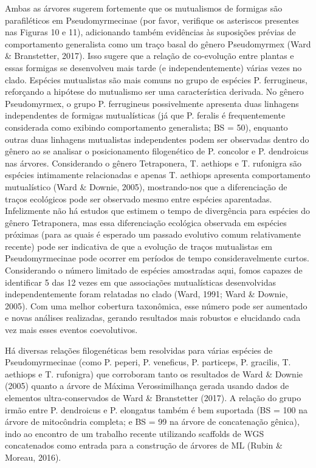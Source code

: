 \documentclass[../DISSERTACAO_MAIN.tex]{subfiles}
\begin{document}
	Ambas as árvores sugerem fortemente que os mutualismos de formigas são parafiléticos em Pseudomyrmecinae (por favor, verifique os asteriscos presentes nas Figuras 10 e 11), adicionando também evidências às suposições prévias de comportamento generalista como um traço basal do gênero Pseudomyrmex (Ward \& Branstetter, 2017). Isso sugere que a relação de co-evolução entre plantas e essas formigas se desenvolveu mais tarde (e independentemente) várias vezes no clado. Espécies mutualistas são mais comuns no grupo de espécies P. ferrugineus, reforçando a hipótese do mutualismo ser uma característica derivada. No gênero Pseudomyrmex, o grupo P. ferrugineus possivelmente apresenta duas linhagens independentes de formigas mutualísticas (já que P. feralis é frequentemente considerada como exibindo comportamento generalista; BS = 50), enquanto outras duas linhagens mutualistas independentes podem ser observadas dentro do gênero ao se analisar o posicionamento filogenético de P. concolor e P. dendroicus nas árvores. Considerando o gênero Tetraponera, T. aethiops e T. rufonigra são espécies intimamente relacionadas e apenas T. aethiops apresenta comportamento mutualístico (Ward \& Downie, 2005), mostrando-nos que a diferenciação de traços ecológicos pode ser observado mesmo entre espécies aparentadas. Infelizmente não há estudos que estimem o tempo de divergência para espécies do gênero Tetraponera, mas essa diferenciação ecológica observada em espécies próximas (para as quais é esperado um passado evolutivo comum relativamente recente) pode ser indicativa de que a evolução de traços mutualistas em Pseudomyrmecinae pode ocorrer em períodos de tempo consideravelmente curtos. Considerando o número limitado de espécies amostradas aqui, fomos capazes de identificar 5 das 12 vezes em que associações mutualísticas desenvolvidas independentemente foram relatadas no clado (Ward, 1991; Ward \& Downie, 2005). Com uma melhor cobertura taxonômica, esse número pode ser aumentado e novas análises realizadas, gerando resultados mais robustos e elucidando cada vez mais esses eventos coevolutivos.
	
	Há diversas relações filogenéticas bem resolvidas para várias espécies de Pseudomyrmecinae (como P. peperi, P. veneficus, P. particeps, P. gracilis, T. aethiops e T. rufonigra) que corroboram tanto os resultados de Ward \& Downie (2005) quanto a árvore de Máxima Verossimilhança gerada usando dados de elementos ultra-conservados de Ward \& Branstetter (2017). A relação do grupo irmão entre P. dendroicus e P. elongatus também é bem suportada (BS = 100 na árvore de mitocôndria completa; e BS = 99 na árvore de concatenação gênica), indo ao encontro de um trabalho recente utilizando scaffolds de WGS concatenados como entrada para a construção de árvores de ML (Rubin \& Moreau, 2016).
	
\end{document}
